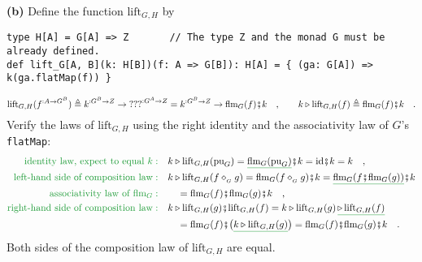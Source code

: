 \textbf{(b)} Define the function $\text{lift}_{G,H}$ by
\begin{lstlisting}
type H[A] = G[A] => Z       // The type Z and the monad G must be already defined.
def lift_G[A, B](k: H[B])(f: A => G[B]): H[A] = { (ga: G[A]) => k(ga.flatMap(f)) }
\end{lstlisting}
\[
\text{lift}_{G,H}(f^{:A\rightarrow G^{B}})\triangleq k^{:G^{B}\rightarrow Z}\rightarrow\text{???}^{:G^{A}\rightarrow Z}=k^{:G^{B}\rightarrow Z}\rightarrow\text{flm}_{G}(f)\bef k\quad,\quad\quad k\triangleright\text{lift}_{G,H}(f)\triangleq\text{flm}_{G}(f)\bef k\quad.
\]
Verify the laws of $\text{lift}_{G,H}$ using the right identity and
the associativity law of $G$\textsf{'}s \lstinline!flatMap!:
\begin{align*}
{\color{greenunder}\text{identity law, expect to equal }k:}\quad & k\triangleright\text{lift}_{G,H}(\text{pu}_{G})=\gunderline{\text{flm}_{G}(\text{pu}_{G})}\bef k=\text{id}\bef k=k\quad,\\
{\color{greenunder}\text{left-hand side of composition law}:}\quad & k\triangleright\text{lift}_{G,H}(f\diamond_{_{G}}g)=\text{flm}_{G}(f\diamond_{_{G}}g)\bef k=\gunderline{\text{flm}_{G}(f\bef\text{flm}_{G}(g))}\bef k\\
{\color{greenunder}\text{associativity law of }\text{flm}_{G}:}\quad & \quad=\text{flm}_{G}(f)\bef\text{flm}_{G}(g)\bef k\quad,\\
{\color{greenunder}\text{right-hand side of composition law}:}\quad & k\triangleright\text{lift}_{G,H}(g)\bef\text{lift}_{G,H}(f)=k\triangleright\text{lift}_{G,H}(g)\,\gunderline{\triangleright\,\text{lift}_{G,H}(f)}\\
 & \quad=\text{flm}_{G}(f)\bef\big(\gunderline{k\triangleright\text{lift}_{G,H}(g)}\big)=\text{flm}_{G}(f)\bef\text{flm}_{G}(g)\bef k\quad.
\end{align*}
Both sides of the composition law of $\text{lift}_{G,H}$ are equal.

